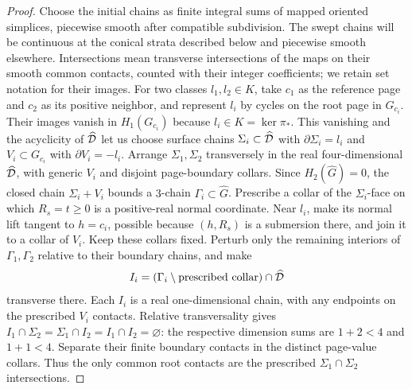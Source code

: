 \begin{proof}
Choose the initial chains as finite integral sums of mapped oriented
simplices, piecewise smooth after compatible subdivision. The swept
chains will be continuous at the conical strata described below and
piecewise smooth elsewhere. Intersections mean transverse intersections of
the maps on their smooth common contacts, counted with their integer
coefficients; we retain set notation for their images.
For two classes \(l_1,l_2\in K\), take \(c_1\) as the reference
page and \(c_2\) as its positive neighbor, and represent \(l_i\)
by cycles on the root page in \(G_{c_i}\). Their images vanish in
\(H_1(G_{c_i})\) because \(l_i\in K=\ker\pi_*\).
This vanishing and the acyclicity of \(\widehat{\mathcal D}\) let us choose
surface chains \(\Sigma_i\subset\widehat{\mathcal D}\) with
\(\partial\Sigma_i=l_i\) and \(V_i\subset G_{c_i}\) with
\(\partial V_i=-l_i\). Arrange \(\Sigma_1,\Sigma_2\)
transversely in the real four-dimensional \(\widehat{\mathcal D}\),
with generic \(V_i\) and disjoint page-boundary collars.
Since \(H_2(\widehat G)=0\),
the closed chain \(\Sigma_i+V_i\) bounds a
\(3\)-chain \(\Gamma_i\subset\widehat G\).
Prescribe a collar of the \(\Sigma_i\)-face on which
\(R_s=t\ge0\) is a positive-real normal coordinate.
Near \(l_i\), make its normal lift tangent to \(h=c_i\),
possible because \((h,R_s)\) is a submersion there, and join
it to a collar of \(V_i\). Keep these collars fixed.
Perturb only the remaining interiors of \(\Gamma_1,\Gamma_2\)
relative to their boundary chains, and make
\[
I_i=(\Gamma_i\setminus\text{prescribed collar})\cap\widehat{\mathcal D}
\]
transverse there. Each \(I_i\) is a real one-dimensional
chain, with any endpoints on the prescribed \(V_i\) contacts.
Relative transversality gives
\(I_1\cap\Sigma_2=\Sigma_1\cap I_2=I_1\cap I_2=\varnothing\):
the respective dimension sums are \(1+2<4\) and \(1+1<4\).
Separate their finite boundary contacts in the distinct
page-value collars. Thus the only common root contacts are
the prescribed \(\Sigma_1\cap\Sigma_2\) intersections.


\end{proof}
